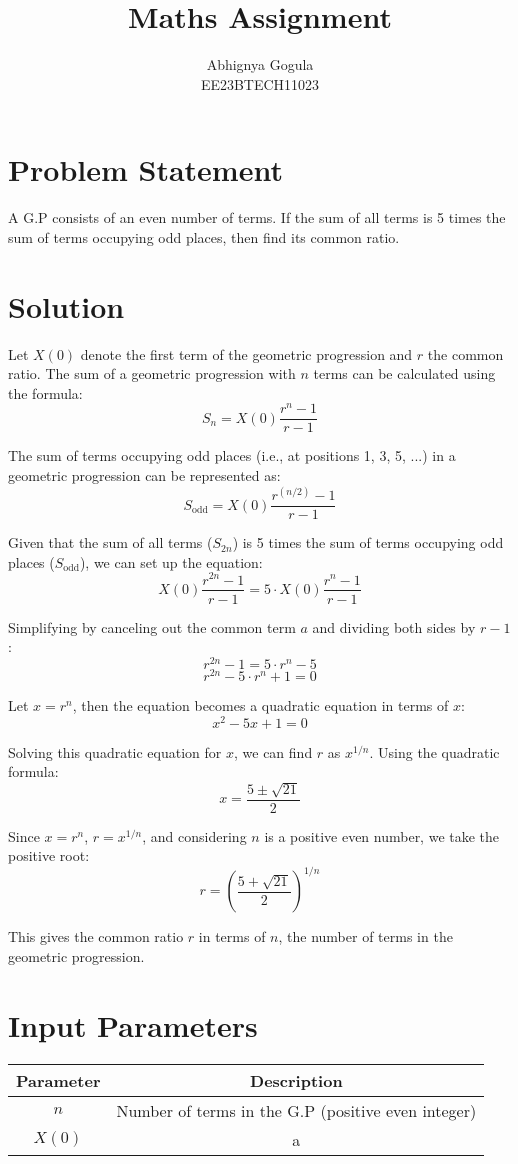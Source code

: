 \documentclass{article}
\begin{document}
\title{Maths Assignment}
\author{Abhignya Gogula\\
        EE23BTECH11023}
\maketitle

\section*{Problem Statement}
A G.P consists of an even number of terms. If the sum of all terms is 5 times the sum of terms occupying odd places, then find its common ratio.

\section*{Solution}
Let \( X(0) \) denote the first term of the geometric progression and \( r \) the common ratio. The sum of a geometric progression with \( n \) terms can be calculated using the formula:
\[ S_n = X(0) \frac{{r^n - 1}}{{r - 1}} \]

The sum of terms occupying odd places (i.e., at positions 1, 3, 5, ...) in a geometric progression can be represented as:
\[ S_{\text{odd}} = X(0) \frac{{r^{(n/2)} - 1}}{{r - 1}} \]

Given that the sum of all terms (\( S_{2n} \)) is 5 times the sum of terms occupying odd places (\( S_{\text{odd}} \)), we can set up the equation:
\[ X(0) \frac{{r^{2n} - 1}}{{r - 1}} = 5 \cdot X(0) \frac{{r^n - 1}}{{r - 1}} \]

Simplifying by canceling out the common term \( a \) and dividing both sides by \( r - 1 \):
\[ r^{2n} - 1 = 5 \cdot r^n - 5 \]
\[ r^{2n} - 5 \cdot r^n + 1 = 0 \]

Let \( x = r^n \), then the equation becomes a quadratic equation in terms of \( x \):
\[ x^2 - 5x + 1 = 0 \]

Solving this quadratic equation for \( x \), we can find \( r \) as \( x^{1/n} \). Using the quadratic formula:
\[ x = \frac{{5 \pm \sqrt{21}}}{2} \]

Since \( x = r^n \), \( r = x^{1/n} \), and considering \( n \) is a positive even number, we take the positive root:
\[ r = \left(\frac{{5 + \sqrt{21}}}{2}\right)^{1/n} \]

This gives the common ratio \( r \) in terms of \( n \), the number of terms in the geometric progression.

\section*{Input Parameters}
\begin{center}
\begin{tabular}{|c|c|}
\hline
Parameter & Description \\
\hline
\( n \) & Number of terms in the G.P (positive even integer) \\
\( X(0) \) & a \\
\hline
\end{tabular}
\end{center}
\end{document}
